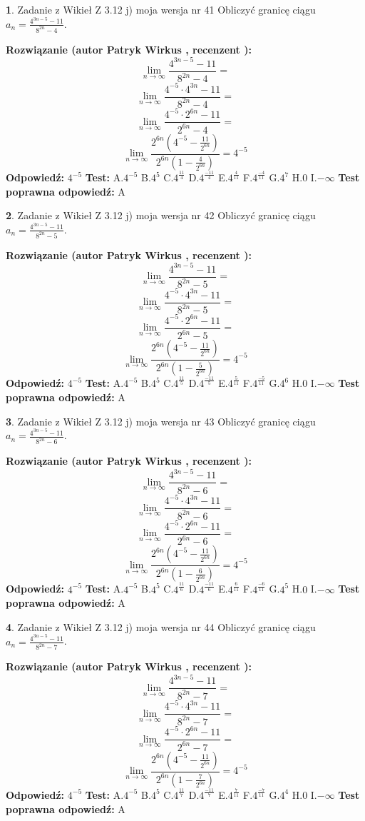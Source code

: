 \documentclass[12pt, a4paper]{article}
\theoremstyle{definition} %
\newtheorem{zad}{}
\newcommand{\zadStart}[1]{\begin{zad}#1\newline}
\newcommand{\zadStop}{\end{zad}}
\newcommand{\rozwStart}[2]{\noindent \textbf{Rozwiązanie (autor #1 , recenzent #2): }\newline}
\newcommand{\rozwStop}{\newline}
\newcommand{\odpStart}{\noindent \textbf{Odpowiedź:}\newline}
\newcommand{\odpStop}{\newline}
\newcommand{\testStart}{\noindent \textbf{Test:}\newline}
\newcommand{\testStop}{\newline}
\newcommand{\kluczStart}{\noindent \textbf{Test poprawna odpowiedź:}\newline}
\newcommand{\kluczStop}{\newline}
\begin{document}
\zadStart{Zadanie z Wikieł Z 3.12 j) moja wersja nr 41}
Obliczyć granicę ciągu $a_{n}=\frac{4^{3n-5}-11}{8^{2n}-4}$.
\zadStop
\rozwStart{Patryk Wirkus}{}
$$\lim\limits_{n\to\infty}\frac{4^{3n-5}-11}{8^{2n}-4}=$$
$$\lim\limits_{n\to\infty}\frac{4^{-5} \cdot 4^{3n}-11}{8^{2n}-4}=$$
$$\lim\limits_{n\to\infty}\frac{4^{-5} \cdot 2^{6n}-11}{2^{6n}-4}=$$
$$\lim\limits_{n\to\infty}\frac{2^{6n}(4^{-5} - \frac{11}{2^{6n}})}{2^{6n}(1-\frac{4}{2^{6n}})}= 4^{-5}$$
\rozwStop
\odpStart
$4^{-5}$
\odpStop
\testStart
A.$4^{-5}$
B.$4^{5}$
C.$4^{\frac{11}{4}}$
D.$4^{\frac{-11}{4}}$
E.$4^{\frac{4}{11}}$
F.$4^{\frac{-4}{11}}$
G.$4^{7}$
H.$0$
I.$-\infty$
\testStop
\kluczStart
A
\kluczStop



\zadStart{Zadanie z Wikieł Z 3.12 j) moja wersja nr 42}
Obliczyć granicę ciągu $a_{n}=\frac{4^{3n-5}-11}{8^{2n}-5}$.
\zadStop
\rozwStart{Patryk Wirkus}{}
$$\lim\limits_{n\to\infty}\frac{4^{3n-5}-11}{8^{2n}-5}=$$
$$\lim\limits_{n\to\infty}\frac{4^{-5} \cdot 4^{3n}-11}{8^{2n}-5}=$$
$$\lim\limits_{n\to\infty}\frac{4^{-5} \cdot 2^{6n}-11}{2^{6n}-5}=$$
$$\lim\limits_{n\to\infty}\frac{2^{6n}(4^{-5} - \frac{11}{2^{6n}})}{2^{6n}(1-\frac{5}{2^{6n}})}= 4^{-5}$$
\rozwStop
\odpStart
$4^{-5}$
\odpStop
\testStart
A.$4^{-5}$
B.$4^{5}$
C.$4^{\frac{11}{5}}$
D.$4^{\frac{-11}{5}}$
E.$4^{\frac{5}{11}}$
F.$4^{\frac{-5}{11}}$
G.$4^{6}$
H.$0$
I.$-\infty$
\testStop
\kluczStart
A
\kluczStop



\zadStart{Zadanie z Wikieł Z 3.12 j) moja wersja nr 43}
Obliczyć granicę ciągu $a_{n}=\frac{4^{3n-5}-11}{8^{2n}-6}$.
\zadStop
\rozwStart{Patryk Wirkus}{}
$$\lim\limits_{n\to\infty}\frac{4^{3n-5}-11}{8^{2n}-6}=$$
$$\lim\limits_{n\to\infty}\frac{4^{-5} \cdot 4^{3n}-11}{8^{2n}-6}=$$
$$\lim\limits_{n\to\infty}\frac{4^{-5} \cdot 2^{6n}-11}{2^{6n}-6}=$$
$$\lim\limits_{n\to\infty}\frac{2^{6n}(4^{-5} - \frac{11}{2^{6n}})}{2^{6n}(1-\frac{6}{2^{6n}})}= 4^{-5}$$
\rozwStop
\odpStart
$4^{-5}$
\odpStop
\testStart
A.$4^{-5}$
B.$4^{5}$
C.$4^{\frac{11}{6}}$
D.$4^{\frac{-11}{6}}$
E.$4^{\frac{6}{11}}$
F.$4^{\frac{-6}{11}}$
G.$4^{5}$
H.$0$
I.$-\infty$
\testStop
\kluczStart
A
\kluczStop



\zadStart{Zadanie z Wikieł Z 3.12 j) moja wersja nr 44}
Obliczyć granicę ciągu $a_{n}=\frac{4^{3n-5}-11}{8^{2n}-7}$.
\zadStop
\rozwStart{Patryk Wirkus}{}
$$\lim\limits_{n\to\infty}\frac{4^{3n-5}-11}{8^{2n}-7}=$$
$$\lim\limits_{n\to\infty}\frac{4^{-5} \cdot 4^{3n}-11}{8^{2n}-7}=$$
$$\lim\limits_{n\to\infty}\frac{4^{-5} \cdot 2^{6n}-11}{2^{6n}-7}=$$
$$\lim\limits_{n\to\infty}\frac{2^{6n}(4^{-5} - \frac{11}{2^{6n}})}{2^{6n}(1-\frac{7}{2^{6n}})}= 4^{-5}$$
\rozwStop
\odpStart
$4^{-5}$
\odpStop
\testStart
A.$4^{-5}$
B.$4^{5}$
C.$4^{\frac{11}{7}}$
D.$4^{\frac{-11}{7}}$
E.$4^{\frac{7}{11}}$
F.$4^{\frac{-7}{11}}$
G.$4^{4}$
H.$0$
I.$-\infty$
\testStop
\kluczStart
A
\kluczStop
\end{document}
